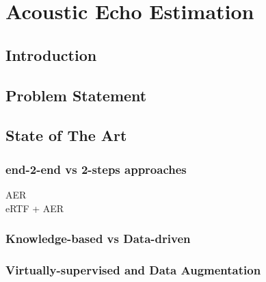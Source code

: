 \chapter{Acoustic Echo Estimation}\label{chap:estimation}

\section{Introduction}
\blindtext[1]


\section{Problem Statement}


\section{State of The Art}

\subsection{end-2-end vs 2-steps approaches}

AER\\
eRTF + AER


\subsection{Knowledge-based vs Data-driven}

\subsection{Virtually-supervised and Data Augmentation}